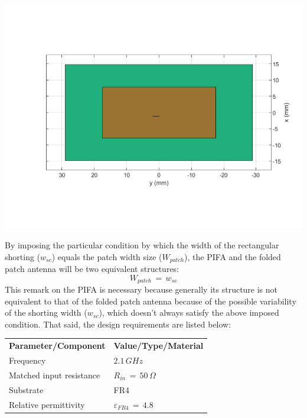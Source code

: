 \documentclass[12pt,a4paper]{article}
\begin{document}
{\begin{center}
			\includegraphics[scale=0.35]{patch_structure_3.pdf}
		\end{center}
		By imposing the particular condition by which the width of the rectangular shorting ($w_{sc}$) equals the patch width size ($W_{patch}$), the PIFA and the folded patch antenna will be two equivalent structures:
		\begin{equation}
			W_{patch}\,=\,w_{sc}
		\end{equation}
		This remark on the PIFA is necessary because generally its structure is not equivalent to that of the folded patch antenna because of the possible variability of the shorting width ($w_{sc}$), which doesn't always satisfy the above imposed condition. That said, the design requirements are listed below: 
		\begin{table}[h]
			\begin{center}
				{\selectfont
					\begin{tabular}{||m{5cm}|m{5cm}||}
						\hline 
						\rowcolor{lightgray}\multicolumn{2}{|c|}{\textbf{Folded patch design parameters}} 
						\\
						\hline
						\cellcolor{mintbg}\textbf{Parameter/Component} & \cellcolor{mintbg}\textbf{Value/Type/Material}\\
						\hline
						Frequency & $2.1\,GHz$ \\
						\hline
						Matched input resistance & $R_{in}\,=\,50\,\Omega$\\
						\hline
						\cellcolor{pink} Substrate & \cellcolor{pink} FR4 \\
						\hline
						Relative permittivity & $\varepsilon_{FR4}\,=\,4.8$ \\
						

\end{tabular}}
\end{center}
\end{table}}
\end{document}
